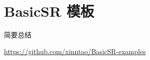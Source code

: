 \documentclass[../main.tex]{subfiles}
\begin{document}
\chapter{BasicSR 模板}
\vspace{-2cm}

简要总结

\url{https://github.com/xinntao/BasicSR-examples}
\end{document}
